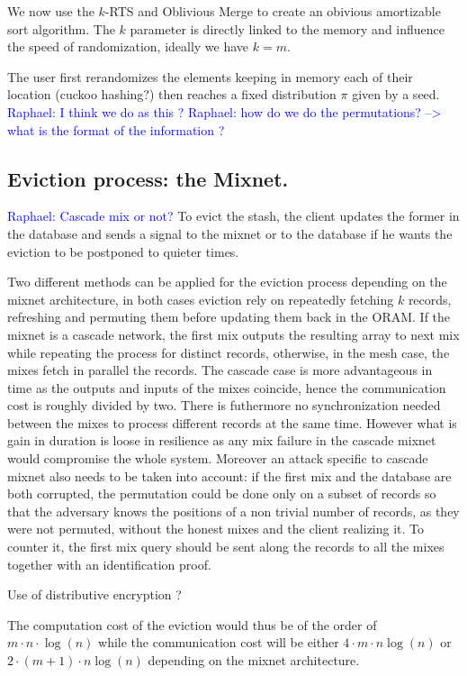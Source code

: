\documentclass[a4paper]{article}
\newcommand{\raphael}[1]{\textcolor{blue}{Raphael: #1}}
\begin{document}
We now use the $k$-RTS and Oblivious Merge to create an obivious amortizable sort algorithm. The $k$ parameter is directly linked to the memory and influence the speed of randomization, ideally we have $k=m$.

The user first rerandomizes the elements keeping in memory each of their location (cuckoo hashing?) then reaches a fixed distribution $\pi$ given by a seed.
\raphael{I think we do as this ?}
\raphael{how do we do the permutations? --> what is the format of the information ?}

\subsection{Eviction process: the Mixnet.}
\raphael{Cascade mix or not?}
To evict the stash, the client updates the former in the database and sends a signal to the mixnet or to the database if he wants the eviction to be postponed to quieter times.

Two different methods can be applied for the eviction process depending on the mixnet architecture, in both cases eviction rely on repeatedly fetching $k$ records, refreshing and permuting them before updating them back in the ORAM.
If the mixnet is a cascade network, the first mix outputs the resulting array to next mix while repeating the process for distinct records, otherwise, in the mesh case, the mixes fetch in parallel the records.
The cascade case is more advantageous in time as the outputs and inputs of the mixes coincide, hence the communication cost is roughly divided by two. There is futhermore no synchronization needed between the mixes to process different records at the same time.
However what is gain in duration is loose in resilience as any mix failure in the cascade mixnet would compromise the whole system. Moreover an attack specific to cascade mixnet also needs to be taken into account: if the first mix and the database are both corrupted, the permutation could be done only on a subset of records
so that the adversary knows the positions of a non trivial number of records, as they were not permuted, without the honest mixes and the client realizing it. To counter it, the first mix query should be sent along the records to all the mixes together with an identification proof.

Use of distributive encryption ?

The computation cost of the eviction would thus be of the order of $m\cdot n \cdot \log(n)$ while the communication cost will be either $4\cdot m \cdot n \log(n)$ or $2\cdot(m+1) \cdot n \log(n)$ depending on the mixnet architecture.
\end{document}
